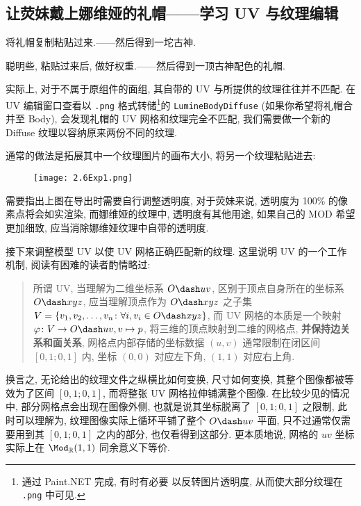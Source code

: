         \subsection{让荧妹戴上娜维娅的礼帽——学习 UV 与纹理编辑}
            \par 将礼帽复制粘贴过来.——然后得到一坨古神.
            \par 聪明些, 粘贴过来后, 做好权重.——然后得到一顶古神配色的礼帽.
            \par 实际上, 对于不属于原组件的面组, 其自带的 UV 与所提供的纹理往往并不匹配. 在 UV 编辑窗口查看以 \texttt{.png} 格式转储\footnote{通过 Paint.NET 完成, 有时有必要  以反转图片透明度, 从而使大部分纹理在 \texttt{.png} 中可见.}的  \texttt{LumineBodyDiffuse} (如果你希望将礼帽合并至 Body), 会发现礼帽的 UV 网格和纹理完全不匹配, 我们需要做一个新的 Diffuse 纹理以容纳原来两份不同的纹理.
            \par 通常的做法是拓展其中一个纹理图片的画布大小, 将另一个纹理粘贴进去:
            \begin{figure}[H]
                \centering
                \texttt{[image: 2.6Exp1.png]}
            \end{figure}
            \par 需要指出上图在导出时需要自行调整透明度, 对于荧妹来说, 透明度为 100\% 的像素点将会如实渲染, 而娜维娅的纹理中, 透明度有其他用途, 如果自己的 MOD 希望更加细致, 应当消除娜维娅纹理中自带的透明度.
            \par 接下来调整模型 UV 以使 UV 网格正确匹配新的纹理. 这里说明 UV 的一个工作机制, 阅读有困难的读者酌情略过:
            \begin{quotation}
                {\color{gray}所谓 UV, 当理解为二维坐标系 \(O\dash uv\), 区别于顶点自身所在的坐标系 \(O\dash xyz\), 应当理解顶点作为 \(O\dash xyz\) 之子集 \(V=\{v_1,v_2,\dots,v_n\colon\forall i, v_i\in O\dash xyz\}\), 而 UV 网格的本质是一个映射 \(\varphi\colon V\to O\dash uv, v\mapsto p\), 将三维的顶点映射到二维的网格点, \textbf{并保持边关系和面关系}, 网格点内部存储的坐标数据 \((u,v)\) 通常限制在闭区间 \([0,1;0,1]\) 内, 坐标 \((0,0)\) 对应左下角, \((1,1)\) 对应右上角.}
            \end{quotation}
            换言之, 无论给出的纹理文件之纵横比如何变换, 尺寸如何变换, 其整个图像都被等效为了区间 \([0,1;0,1]\), 而将整张 UV 网格拉伸铺满整个图像. 在比较少见的情况中, 部分网格点会出现在图像外侧, 也就是说其坐标脱离了 \([0,1;0,1]\) 之限制, 此时可以理解为, 纹理图像实际上循环平铺了整个 \(O\dash uv\) 平面, 只不过通常仅需要用到其 \([0,1;0,1]\) 之内的部分, 也仅看得到这部分. 更本质地说, 网格的 \(uv\) 坐标实际上在 \(\Mod_{\mathbb{R}} (1,1)\) 同余意义下等价.
